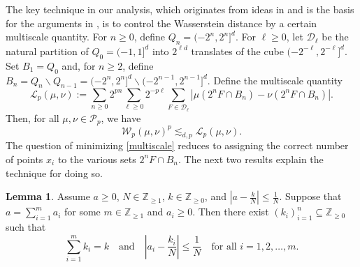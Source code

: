 \documentclass[11pt,reqno]{amsart}
\newcommand{\bx}{{\bm{x}}}
\theoremstyle{definition}
\def\bx{{\boldsymbol x}}
\newcommand{\bm}[1]{\boldsymbol #1}
\newcommand{\RR}{{\mathbb R}}
\newcommand{\ZZ}{{\mathbb Z}}
\newcommand{\mcl}{\mathcal}
\newtheorem{lemma}{Lemma}
\theoremstyle{definition}
\numberwithin{equation}{section}
\numberwithin{lemma}{section}
\numberwithin{proposition}{section}
\numberwithin{theorem}{section}
\numberwithin{corollary}{section}
\numberwithin{definition}{section}
\numberwithin{remark}{section}
\begin{document}
The key technique in our analysis, which originates from ideas in \cite{DSS} and is the basis for the arguments in \cite{FG}, is to control the Wasserstein distance by a certain multiscale quantity. For $n \ge 0$, define $Q_n = (-2^{n}, 2^{n}]^d$. For $\ell \ge 0$, let $\mcl D_\ell$ be the natural partition of $Q_0 = (-1,1]^d$ into $2^{\ell d}$ translates of the cube $(-2^{-\ell}, 2^{-\ell}]^d$. Set $B_1 = Q_0$ and, for $n \ge 2$, define $B_n = Q_{n} \backslash Q_{n-1} = (-2^n, 2^n]^d \backslash (-2^{n-1}, 2^{n-1}]^d$. Define the multiscale quantity
\begin{equation}\label{multiscale}
	\mcl L_p(\mu,\nu) := \sum_{n\ge 0} 2^{pn} \sum_{\ell \ge 0} 2^{-p \ell} \sum_{F \in \mcl D_\ell} |\mu(2^n F \cap B_n) - \nu(2^n F \cap B_n)|.
\end{equation}
Then, for all $\mu,\nu \in \mcl P_p$, we have \cite[Lemmas 5 and 6]{FG}
\begin{equation}\label{multiscale:bound}
	\mcl W_p(\mu,\nu)^p \lesssim_{d,p} \mcl L_p(\mu,\nu).
\end{equation}
The question of minimizing \eqref{multiscale} reduces to assigning the correct number of points $x_i$ to the various sets $2^n F \cap B_n$. The next two results explain the technique for doing so.

\begin{lemma}\label{lem:decomposenumbers}
	Assume $a \ge 0$, $N \in \ZZ_{\ge 1}$, $k \in \ZZ_{\ge 0}$, and $\left| a - \frac{k}{N} \right| \le \frac{1}{N}$. Suppose that $a = \sum_{i=1}^m a_i$ for some $m \in \ZZ_{\ge 1}$ and $a_i \ge 0$. Then there exist $(k_i)_{i=1}^n \subseteq \ZZ_{\ge 0}$ such that
	\[
		\sum_{i=1}^m k_i = k \quad \text{and} \quad \left| a_i - \frac{k_i}{N} \right| \le \frac{1}{N} \quad \text{for all } i = 1,2,\ldots,m.
	\]
\end{lemma}
\end{document}
